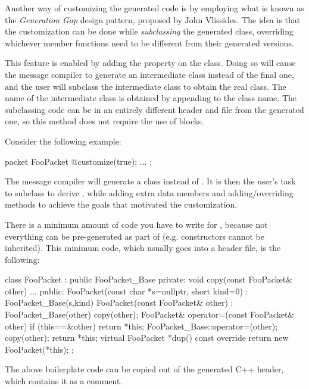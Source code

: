 Another way of customizing the generated code is by employing what is known as
the \textit{Generation Gap} design pattern, proposed by John Vlissides. The idea
is that the customization can be done while \textit{subclassing} the generated
class, overriding whichever member functions need to be different from their
generated versions.

This feature is enabled by adding the  property on the class.
Doing so will cause the message compiler to generate an intermediate class
instead of the final one, and the user will subclass the intermediate class to
obtain the real class. The name of the intermediate class is obtained by
appending  to the class name. The subclassing code can be in an
entirely different header and  file from the generated one, so this
method does not require the use of  blocks.

Consider the following example:

\begin{msg}
packet FooPacket
{
   @customize(true);
   ...
};
\end{msg}

The message compiler will generate a  class instead of
. It is then the user's task to subclass  to
derive , while adding extra data members and adding/overriding
methods to achieve the goals that motivated the customization.

There is a minimum amount of code you have to write for , because
not everything can be pre-generated as part of  (e.g.
constructors cannot be inherited). This minimum code, which usually goes into a
header file, is the following:

\begin{cpp}
class FooPacket : public FooPacket_Base
{
  private:
    void copy(const FooPacket& other) { ... }
  public:
    FooPacket(const char *s=nullptr, short kind=0) : FooPacket_Base(s,kind) {}
    FooPacket(const FooPacket& other) : FooPacket_Base(other) {copy(other);}
    FooPacket& operator=(const FooPacket& other) {if (this==&other) return *this;
        FooPacket_Base::operator=(other); copy(other); return *this;}
    virtual FooPacket *dup() const override {return new FooPacket(*this);}
};
\end{cpp}

\begin{note}
  The above boilerplate code can be copied out of the generated C++ header, which
  contains it as a comment.
\end{note}

